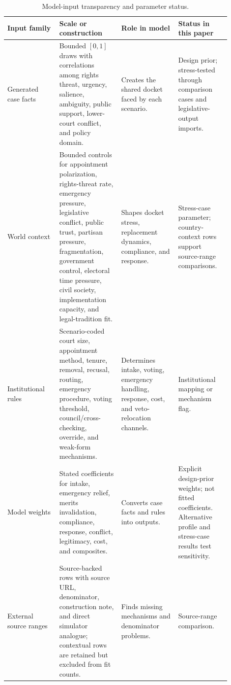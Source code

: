 \documentclass[
  journal=small,
  manuscript=research-article,
  year=2026
]{cup-journal}
\begin{document}
\begin{table}[hbt!]
\centering
\caption{Model-input transparency and parameter status.}
\label{tab:model-transparency}
\scriptsize
\setlength{\tabcolsep}{3pt}
\begin{tabular}{@{}L{0.21\linewidth}L{0.25\linewidth}L{0.23\linewidth}L{0.21\linewidth}@{}}
\toprule
Input family & Scale or construction & Role in model & Status in this paper \\
\midrule
Generated case facts & Bounded $[0,1]$ draws with correlations among rights threat, urgency, salience, ambiguity, public support, lower-court conflict, and policy domain. & Creates the shared docket faced by each scenario. & Design prior; stress-tested through comparison cases and legislative-output imports. \\
World context & Bounded controls for appointment polarization, rights-threat rate, emergency pressure, legislative conflict, public trust, partisan pressure, fragmentation, government control, electoral time pressure, civil society, implementation capacity, and legal-tradition fit. & Shapes docket stress, replacement dynamics, compliance, and response. & Stress-case parameter; country-context rows support source-range comparisons. \\
Institutional rules & Scenario-coded court size, appointment method, tenure, removal, recusal, routing, emergency procedure, voting threshold, council/cross-checking, override, and weak-form mechanisms. & Determines intake, voting, emergency handling, response, cost, and veto-relocation channels. & Institutional mapping or mechanism flag. \\
Model weights & Stated coefficients for intake, emergency relief, merits invalidation, compliance, response, conflict, legitimacy, cost, and composites. & Converts case facts and rules into outputs. & Explicit design-prior weights; not fitted coefficients. Alternative profile and stress-case results test sensitivity. \\
External source ranges & Source-backed rows with source URL, denominator, construction note, and direct simulator analogue; contextual rows are retained but excluded from fit counts. & Finds missing mechanisms and denominator problems. & Source-range comparison. \\
\bottomrule
\end{tabular}
\end{table}
\end{document}
